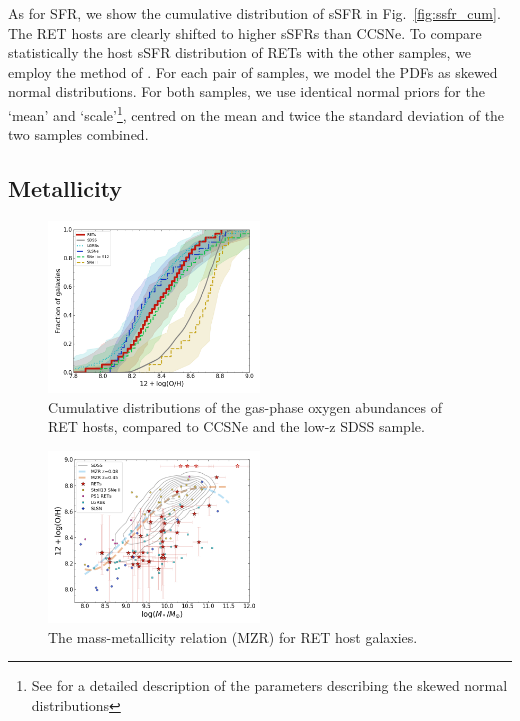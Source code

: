 \documentclass[fleqn,usenatbib,]{mnras}
\begin{document}
As for SFR, we show the cumulative distribution of sSFR in Fig.~\ref{fig:ssfr_cum}. The RET hosts are clearly shifted to higher sSFRs than CCSNe. To compare statistically the host sSFR distribution of RETs with the other samples, we employ the method of \citet{Wiseman2020}. For each pair of samples, we model the PDFs as skewed normal distributions. For both samples, we use identical normal priors for the `mean' and `scale'\footnote{See \citet{Wiseman2020} for a detailed description of the parameters describing the skewed normal distributions}, centred on the mean and twice the standard deviation of the two samples combined. 

\subsection{Metallicity \label{subsec:res_metallicity}}

\begin{figure}
\includegraphics[width=0.5\textwidth]{figs/RET_OH_cum.png}
\caption{Cumulative distributions of the gas-phase oxygen abundances of RET hosts, compared to CCSNe and the low-z SDSS sample.
\label{fig:oh_cum}}
\end{figure}

\begin{figure}
\includegraphics[width=0.5\textwidth]{figs/RET_MZR.png}
\caption{The mass-metallicity relation (MZR) for RET host galaxies.
\label{fig:mzr}}
\end{figure}
\end{document}
